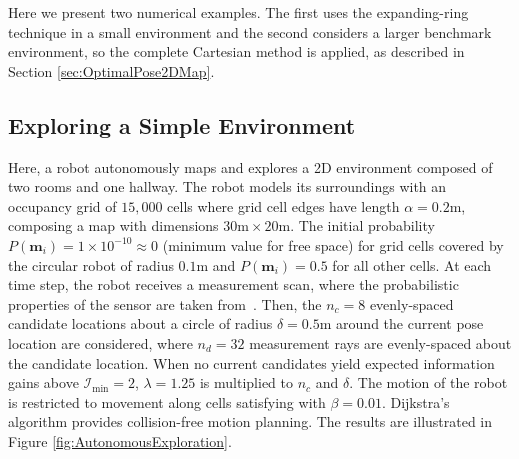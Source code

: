 Here we present two numerical examples. The first uses the expanding-ring technique in a small environment and the second considers a larger benchmark environment, so the complete Cartesian method is applied, as described in Section \ref{sec:OptimalPose2DMap}.

\subsection{Exploring a Simple Environment}

Here, a robot autonomously maps and explores a 2D environment composed of two rooms and one hallway. The robot models its surroundings with an occupancy grid of $15,000$ cells where grid cell edges have length $\alpha=0.2$m, composing a map with dimensions $30\text{m}\times20\text{m}$. The initial probability $P(\mathbf{m}_i)=1\times10^{-10}\approx0$ (minimum value for free space) for grid cells covered by the circular robot of radius $0.1$m and $P(\mathbf{m}_i)=0.5$ for all other cells.
At each time step, the robot receives a measurement scan, where the probabilistic properties of the sensor are taken from~\cite{PirRutBisSch11,KhoElb12}. Then, the $n_c=8$ evenly-spaced candidate locations about a circle of radius $\delta=0.5$m around the current pose location are considered, where $n_d=32$ measurement rays are evenly-spaced about the candidate location.  When no current candidates yield expected information gains above $\mathcal I_\text{min}=2$, $\lambda=1.25$ is multiplied to $n_c$ and $\delta$. The motion of the robot is restricted to movement along cells satisfying  with $\beta=0.01$. Dijkstra's algorithm provides collision-free motion planning.
The results are illustrated in Figure \ref{fig:AutonomousExploration}.


